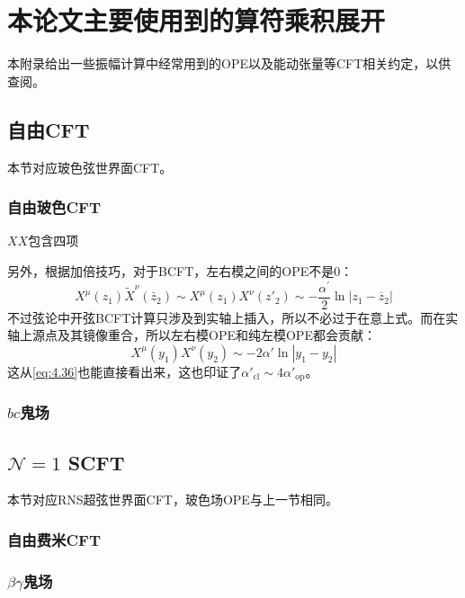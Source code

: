 
\chapter{本论文主要使用到的算符乘积展开}
\label{appendix:A}
本附录给出一些振幅计算中经常用到的OPE以及能动张量等CFT相关约定，以供查阅。
\section{自由CFT}
本节对应玻色弦世界面CFT。
\subsection{自由玻色CFT}
$XX$包含四项

另外，根据加倍技巧，对于BCFT，左右模之间的OPE不是$0$：
\begin{equation}
	X^\mu(z_1)\tilde X^\nu(\bar z_2)\sim X^\mu(z_1)X^\nu(z'_2)\sim -\frac{\alpha^{\prime}}{2}\ln|z_1-\overline{z}_2|
\end{equation}
不过弦论中开弦BCFT计算只涉及到实轴上插入，所以不必过于在意上式。而在实轴上源点及其镜像重合，所以左右模OPE和纯左模OPE都会贡献：
\begin{equation}
	 X^\mu (y_1) X^\nu(y_2) \sim -2\alpha'\ln |y_1-y_2|
\end{equation}
这从\ref{eq:4.36}也能直接看出来，这也印证了$\alpha'_{\text{cl}}\sim4\alpha'_{\text{op}}$。
\subsection{$bc$鬼场}
\section{$\mathcal{N}=1$ SCFT}
本节对应RNS超弦世界面CFT，玻色场OPE与上一节相同。
\subsection{自由费米CFT}

\subsection{$\beta\gamma$鬼场}

